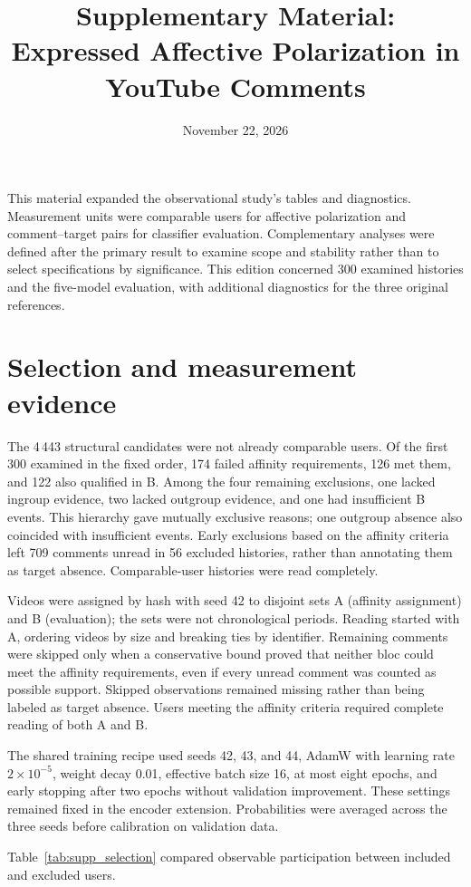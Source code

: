 \documentclass[11pt,a4paper]{article}
\title{Supplementary Material: Expressed Affective Polarization in YouTube Comments}
\author{}
\date{November 22, 2026}
\begin{document}
\maketitle
This material expanded the observational study's tables and diagnostics. Measurement units were comparable users for affective polarization and comment--target pairs for classifier evaluation. Complementary analyses were defined after the primary result to examine scope and stability rather than to select specifications by significance. This edition concerned 300 examined histories and the five-model evaluation, with additional diagnostics for the three original references.
\section{Selection and measurement evidence}
The 4\,443 structural candidates were not already comparable users. Of the first 300 examined in the fixed order, 174 failed affinity requirements, 126 met them, and 122 also qualified in B. Among the four remaining exclusions, one lacked ingroup evidence, two lacked outgroup evidence, and one had insufficient B events. This hierarchy gave mutually exclusive reasons; one outgroup absence also coincided with insufficient events. Early exclusions based on the affinity criteria left 709 comments unread in 56 excluded histories, rather than annotating them as target absence. Comparable-user histories were read completely.

Videos were assigned by hash with seed 42 to disjoint sets A (affinity assignment) and B (evaluation); the sets were not chronological periods. Reading started with A, ordering videos by size and breaking ties by identifier. Remaining comments were skipped only when a conservative bound proved that neither bloc could meet the affinity requirements, even if every unread comment was counted as possible support. Skipped observations remained missing rather than being labeled as target absence. Users meeting the affinity criteria required complete reading of both A and B.

The shared training recipe used seeds 42, 43, and 44, AdamW with learning rate $2\times10^{-5}$, weight decay 0.01, effective batch size 16, at most eight epochs, and early stopping after two epochs without validation improvement. These settings remained fixed in the encoder extension. Probabilities were averaged across the three seeds before calibration on validation data.



Table~\ref{tab:supp_selection} compared observable participation between included and excluded users.
\end{document}
